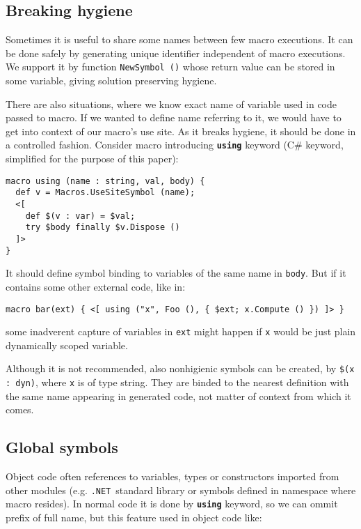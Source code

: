 \documentclass{llncs}
\newcommand{\net}[0]{{\tt .NET}}
\newcommand{\kw}[1]{{\tt \bf #1}}
\begin{document}
\subsection{Breaking hygiene}
Sometimes it is useful to share some names between few macro executions.
It can be done safely by generating unique identifier independent of macro
executions. We support it by function \verb,NewSymbol (), whose return value
can be stored in some variable, giving solution preserving hygiene.

There are also situations, where we know exact name of variable used in code
passed to macro. If we wanted to define name referring to it, we would have to
get into context of our macro's use site. As it breaks hygiene, it should be done
in a controlled fashion. Consider macro introducing \kw{using} keyword (C\# keyword,
simplified for the purpose of this paper):

\begin{verbatim}
macro using (name : string, val, body) {
  def v = Macros.UseSiteSymbol (name);
  <[ 
    def $(v : var) = $val;
    try $body finally $v.Dispose ()
  ]>
}
\end{verbatim}

It should define symbol binding to variables of the same name in \verb,body,.
But if it contains some other external code, like in:

\begin{verbatim}
macro bar(ext) { <[ using ("x", Foo (), { $ext; x.Compute () }) ]> }
\end{verbatim} %

some inadverent capture of variables in \verb,ext, might happen if 
\verb,x, would be just plain dynamically scoped variable.

Although it is not recommended, also nonhigienic symbols can be created, by
\verb,$(x : dyn),, where \verb,x, is of type string. %
They are binded to the nearest definition with the same name appearing in 
generated code, not matter of context from which it comes.

\subsection{Global symbols}
Object code often references to variables, types or constructors imported
from other modules (e.g. \net\ standard library or symbols defined in 
namespace where macro resides). In normal code it is done by \kw{using}
keyword, so we can ommit prefix of full name, but this feature used in
object code like:
\end{document}
